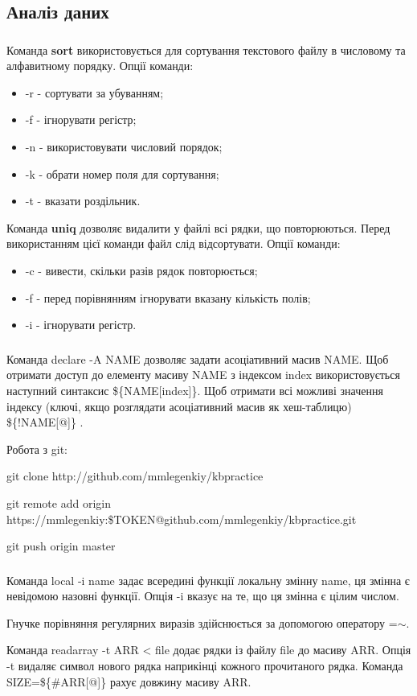 \documentclass[t]{beamer}  %
\begin{document}
\subsection{Аналіз даних}

\begin{frame}
	\frametitle{\insertsection} 
	\framesubtitle{\insertsubsection}
Команда \textbf{sort} використовується для сортування текстового файлу в числовому та алфавитному порядку. Опції команди:
\begin{itemize}
  \item -r - сортувати за убуванням;
  \item -f - ігнорувати регістр;
  \item -n - використовувати числовий порядок;
  \item -k - обрати номер поля для сортування;
  \item -t - вказати роздільник.
\end{itemize}
Команда \textbf{uniq} дозволяє видалити у файлі всі рядки, що повторюються. Перед використанням цієї команди файл слід відсортувати. Опції команди:
\begin{itemize}
  \item -c - вивести, скільки разів рядок повторюється;
  \item -f - перед порівнянням ігнорувати вказану кількість полів;
  \item -i - ігнорувати регістр.
\end{itemize} 
\end{frame}

\begin{frame}
	\frametitle{\insertsection} 
	\framesubtitle{\insertsubsection}
Команда declare -A NAME дозволяє задати асоціативний масив NAME. Щоб отримати доступ до елементу масиву NAME з індексом index використовується наступний синтаксис \$\{NAME[index]\}. Щоб отримати всі можливі значення індексу (ключі, якщо розглядати асоціативний масив як хеш-таблицю) \$\{!NAME[@]\} .

Робота з git:

git clone http://github.com/mmlegenkiy/kb\textunderscore practice

git remote add origin https://mmlegenkiy:\$TOKEN@github.com/mmlegenkiy/kb\textunderscore practice.git

git push origin master

\end{frame}

\begin{frame}
	\frametitle{\insertsection} 
	\framesubtitle{\insertsubsection}
Команда local -i name задає всередині функції локальну змінну name, ця змінна є невідомою назовні функції. Опція -i вказує на те, що ця змінна є цілим числом.

Гнучке порівняння регулярних виразів здійснюється за допомогою оператору =$\sim$.

Команда readarray -t ARR < file додає рядки із файлу file до масиву ARR. Опція -t видаляє символ нового рядка наприкінці кожного прочитаного рядка. Команда SIZE=\$\{\#ARR[@]\} рахує довжину масиву ARR.
\end{frame}
\end{document}
